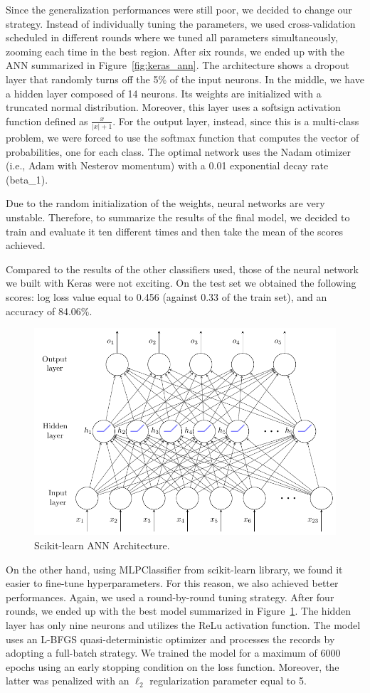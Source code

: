 \documentclass[10pt, a4paper, twocolumn]{article}
\begin{document}
Since the generalization performances were still poor, we decided to change our strategy. Instead of individually tuning the parameters, we used cross-validation scheduled in different rounds where we tuned all parameters simultaneously, zooming each time in the best region. After six rounds, we ended up with the ANN summarized in Figure~\ref{fig:keras_ann}. The architecture shows a dropout layer that randomly turns off the 5\% of the input neurons. In the middle, we have a hidden layer composed of 14 neurons. Its weights are initialized with a truncated normal distribution. Moreover, this layer uses a softsign activation function defined as $\frac{x}{|x| +1}$. For the output layer, instead, since this is a multi-class problem, we were forced to use the softmax function that computes the vector of probabilities, one for each class. The optimal network uses the Nadam otimizer (i.e., Adam with Nesterov momentum) with a 0.01 exponential decay rate (beta\_1).

Due to the random initialization of the weights, neural networks are very unstable. Therefore, to summarize the results  of the final model, we decided to train and evaluate it ten different times and then take the mean of the scores achieved. 

Compared to the results of the other classifiers used, those of the neural network we built with Keras were not exciting. On the test set we obtained the following scores: log loss value equal to 0.456 (against 0.33 of the train set), and an accuracy of 84.06\%.

\begin{figure}
    \centering
    \includegraphics[width=0.7\linewidth]{immagini simone/sklearn_ann.pdf}
    \caption{Scikit-learn ANN Architecture.}
    \label{fig:sklearn_ann}
\end{figure}

On the other hand, using MLPClassifier from scikit-learn library, we found it easier to fine-tune hyperparameters. For this reason, we also achieved better performances. Again, we used a round-by-round tuning strategy. After four rounds, we ended up with the best model summarized in Figure~\ref{fig:sklearn_ann}. The hidden layer has only nine neurons and utilizes the ReLu activation function. The model uses an L-BFGS quasi-deterministic optimizer and processes the records by adopting a full-batch strategy. We trained the model for a maximum of 6000 epochs using an early stopping condition on the loss function. Moreover, the latter was penalized with an $\ell_2$ regularization parameter equal to 5. 
\end{document}
